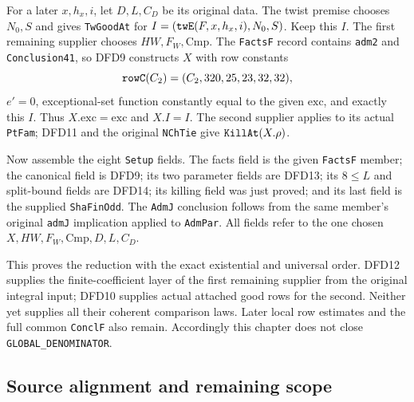 For a later $x,h_x,i$, let $D,L,C_D$ be its original
data. The twist premise chooses $N_0,S$ and gives
\texttt{Tw\allowbreak Good\allowbreak At} for
$I=(\texttt{tw\allowbreak E}(F,x,h_x,i),N_0,S)$. Keep this $I$.
The first remaining supplier chooses $HW,F_W,\mathrm{Cmp}$.
The \texttt{Facts\allowbreak F} record contains \texttt{adm2} and
\texttt{Conclusion41}, so DFD9 constructs $X$ with
row constants
\[
            \texttt{row\allowbreak C}(C_2)=(C_2,320,25,23,32,32),
\]
$e'=0$, exceptional-set function constantly equal to
the given $\mathrm{exc}$, and exactly this $I$.
Thus $X.\mathrm{exc}=\mathrm{exc}$ and
$X.I=I$. The second supplier applies to its actual
\texttt{Pt\allowbreak Fam}; DFD11 and the original \texttt{NCh\allowbreak Tie}
give $\texttt{Kill\allowbreak At}(X.\rho)$.

Now assemble the eight \texttt{Setup} fields.
The facts field is the given \texttt{Facts\allowbreak F} member;
the canonical field is DFD9; its two parameter fields
are DFD13; its $8\le L$ and split-bound fields are
DFD14; its killing field was just proved; and its last
field is the supplied \texttt{Sha\allowbreak Fin\allowbreak Odd}. The
\texttt{Adm\allowbreak J} conclusion follows from the same member's
original \texttt{adm\allowbreak J} implication applied to
\texttt{Adm\allowbreak Par}. All fields refer to the one chosen
$X,HW,F_W,\mathrm{Cmp},D,L,C_D$.

This proves the reduction with the exact existential and
universal order. DFD12 supplies the finite-coefficient
layer of the first remaining supplier from the original
integral input; DFD10 supplies actual attached good rows
for the second. Neither yet supplies all their coherent
comparison laws. Later local row estimates and the full
common \texttt{Concl\allowbreak F} also remain. Accordingly this
chapter does not close \texttt{GLOBAL\_\allowbreak DENOMINATOR}.

\subsection{Source alignment and remaining scope}

